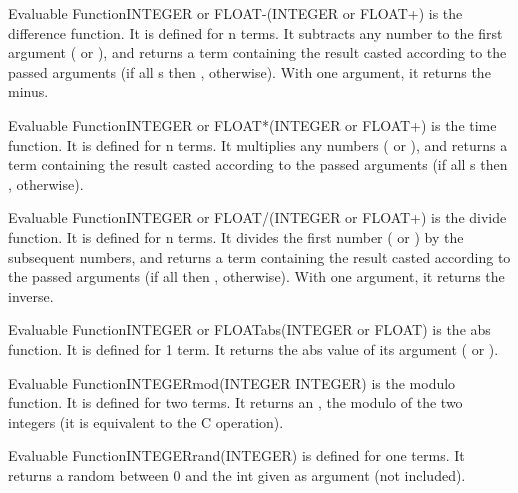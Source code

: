 \begin{typeefa}{Evaluable Function}{INTEGER or FLOAT}{-}{({INTEGER or FLOAT}+)}
is the difference function. It is defined for n terms. It subtracts any
number to the first argument ( or ), and returns a term containing
the result casted according to the passed arguments (if all s then ,
 otherwise). With one argument, it returns the minus.
\end{typeefa}

\begin{typeefa}{Evaluable Function}{INTEGER or FLOAT}{*}{({INTEGER or FLOAT}+)}
is the time function. It is defined for n terms. It multiplies any numbers
( or ), and returns a term containing the result casted according
to the passed arguments (if all s then ,  otherwise).
\end{typeefa}

\begin{typeefa}{Evaluable Function}{INTEGER or FLOAT}{/}{({INTEGER or FLOAT}+)}
is the divide function. It is defined for n terms. It divides the first
number ( or ) by the subsequent numbers, and returns a term
containing the result casted according to the passed arguments (if all 
then ,  otherwise). With one argument, it returns the inverse.
\end{typeefa}

\begin{typeefa}{Evaluable Function}{INTEGER or FLOAT}{abs}{({INTEGER or FLOAT})}
is the abs function. It is defined for 1 term. It returns the abs value of
its argument ( or ).
\end{typeefa}

\begin{typeefa}{Evaluable Function}{INTEGER}{mod}{(INTEGER INTEGER)}
is the modulo function. It is defined for two  terms. It returns an
, the modulo of the two integers (it is equivalent to the C
\code{\%} operation).
\end{typeefa}

\begin{typeefa}{Evaluable Function}{INTEGER}{rand}{(INTEGER)}
 is defined for one  terms. It returns a random
 between 0 and the int given as argument (not included).
\end{typeefa}

